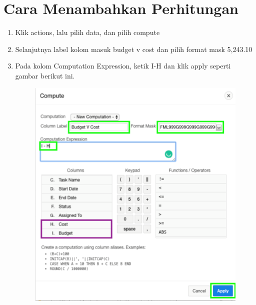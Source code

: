 \section{Cara Menambahkan Perhitungan}
\begin{enumerate}
    \item{Klik actions, lalu pilih data, dan pilih compute}
    \item{Selanjutnya label kolom masuk budget v cost dan pilih format mask 5,243.10}
    \item{Pada kolom Computation Expression, ketik I-H dan klik apply seperti gambar berikut ini.}
\begin{figure}[!htbp]
    \centering
    \includegraphics[scale=0.5]{section/gambar_bab2/budget.png}
    \label{penanda}
\end{figure}
\end{enumerate}

